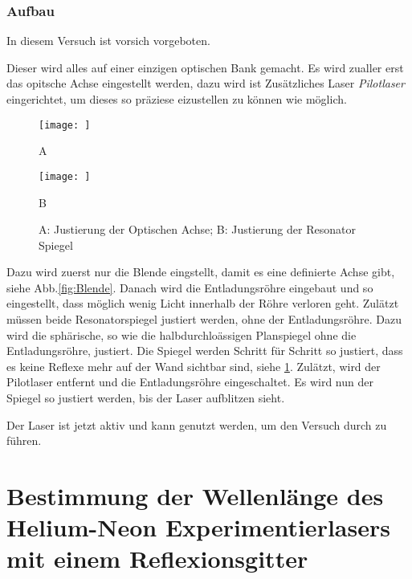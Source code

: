 \subsection{Aufbau}


In diesem Versuch ist vorsich vorgeboten.


Dieser wird alles auf einer einzigen optischen Bank gemacht.
Es wird zualler erst das opitsche Achse eingestellt werden, dazu wird ist Zusätzliches Laser \textit{Pilotlaser} eingerichtet, um dieses so präziese  eizustellen zu können wie möglich. 
\FloatBarrier
\begin{figure}[htbp]
    \centering
    \begin{minipage}[t]{0.48\textwidth}
        \centering
        \texttt{[image: ]}
        \caption{A}
        \label{fig:Blende}
    \end{minipage}
    \hfill
    \begin{minipage}[t]{0.48\textwidth}
        \centering
        \texttt{[image: ]}
        \caption{B}
        \label{fig:Spiegel}
    \end{minipage}
    \caption{A: Justierung der Optischen Achse; B: Justierung der Resonator Spiegel \cite{praktikum}}
\end{figure}
\FloatBarrier
Dazu wird zuerst nur die Blende eingstellt, damit es eine definierte Achse gibt, siehe Abb.\ref{fig:Blende}.
Danach wird die Entladungsröhre eingebaut und so eingestellt, dass möglich wenig Licht innerhalb der Röhre verloren geht.
Zulätzt müssen beide Resonatorspiegel justiert werden, ohne der Entladungsröhre. 
Dazu wird die sphärische, so wie die halbdurchloässigen Planspiegel ohne die Entladungsröhre, justiert.  
Die Spiegel werden Schritt für Schritt so justiert, dass es keine Reflexe mehr auf der Wand sichtbar sind, siehe \ref{fig:Spiegel}.
Zulätzt, wird der Pilotlaser entfernt und die Entladungsröhre eingeschaltet. 
Es wird nun der Spiegel so justiert werden, bis der Laser aufblitzen sieht.

Der Laser ist jetzt aktiv und kann genutzt werden, um den Versuch durch zu führen. 

\chapter{Bestimmung der Wellenlänge des Helium-Neon Experimentierlasers mit einem Reflexionsgitter}


